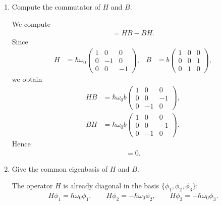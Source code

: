 \documentclass[11pt,a4paper]{scrartcl}
\begin{document}
\begin{enumerate}[label=(\alph*)]
    \item Compute the commutator of $H$ and $B$.
    \begin{calculationbox}
        We compute
        \begin{align*}
            [H,B] = HB - BH.
        \end{align*}
        Since
        \begin{align*}
            H &= \hbar\omega_0
            \begin{pmatrix}
                1 & 0 & 0 \\
                0 & -1 & 0 \\
                0 & 0 & -1
            \end{pmatrix},
            &
            B &= b
            \begin{pmatrix}
                1 & 0 & 0 \\
                0 & 0 & 1 \\
                0 & 1 & 0
            \end{pmatrix},
        \end{align*}
        we obtain
        \begin{align*}
            HB
            &= \hbar\omega_0 b
            \begin{pmatrix}
                1 & 0 & 0 \\
                0 & 0 & -1 \\
                0 & -1 & 0
            \end{pmatrix},
            \\
            BH
            &= \hbar\omega_0 b
            \begin{pmatrix}
                1 & 0 & 0 \\
                0 & 0 & -1 \\
                0 & -1 & 0
            \end{pmatrix}.
        \end{align*}
        Hence
        \begin{align*}
            [H,B] = 0.
        \end{align*}
    \end{calculationbox}

    \item Give the common eigenbasis of $H$ and $B$.
    \begin{calculationbox}
        The operator $H$ is already diagonal in the basis $\{\phi_1,\phi_2,\phi_3\}$:
        \begin{align*}
            H\phi_1 = \hbar\omega_0 \phi_1,
            \qquad
            H\phi_2 = -\hbar\omega_0 \phi_2,
            \qquad
            H\phi_3 = -\hbar\omega_0 \phi_3.
        \end{align*}


\end{calculationbox}
\end{enumerate}
\end{document}
